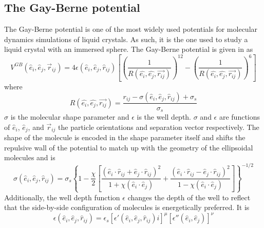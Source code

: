 \documentclass[preprint, aps]{revtex4-1}
\begin{document}
\subsection*{The Gay-Berne potential}
The Gay-Berne potential is one of the most widely used potentials for molecular 
dynamics simulations of liquid crystals. As such, it is the one used to study a
liquid crystal with an immersed sphere. The Gay-Berne potential is given in
\cite{luckhurst06} as
	\begin{equation} \label{gay-berne}
		V^{GB}(\hat{e}_i,\hat{e}_j,\vec{r}_{ij})
			= 4\epsilon (\hat{e}_i,\hat{e}_j,\hat{r}_{ij}) 
			\left[
				\left(\frac{1}{R(\hat{e_i},\hat{e_j},\vec{r_{ij}})}\right)^{12}
				- 
				\left(\frac{1}{R(\hat{e_i},\hat{e_j},\vec{r_{ij}})}\right)^{6}
			\right]
	\end{equation}
where
	\begin{equation} \label{distance-term}
		R(\hat{e_i},\hat{e_j},\vec{r_{ij}}) = \frac{
			r_{ij} - \sigma(\hat{e}_i,\hat{e}_j,\hat{r}_{ij})
			+ \sigma_s
		}
		{
			\sigma_s
		}
	\end{equation}
$\sigma$ is the molecular shape parameter and $\epsilon$ is the well depth. 
$\sigma$ and $\epsilon$ are functions of $\hat{e}_i$, $\hat{e}_j$, and 
$\vec{r}_{ij}$ the particle orientations and separation vector respectively. 
The shape of the molecule is encoded in the shape parameter itself and shifts 
the repulsive wall of the potential to match up with the geometry of the
ellipsoidal molecules and is
	\begin{equation} \label{distance-function}
		\sigma(\hat{e}_i,\hat{e}_j,\hat{r}_{ij})
		= \sigma_s \left\{
			1 
			- \frac{\chi}{2} \left[
				\frac{
					(\hat{e}_i \cdot \hat{r}_{ij} 
					+ \hat{e}_j \cdot \hat{r}_{ij})^2
				}
				{
					1 + \chi(\hat{e}_i \cdot \hat{e}_j)
				}
				+\frac{
					(\hat{e}_i \cdot \hat{r}_{ij} 
					- \hat{e}_j \cdot \hat{r}_{ij})^2
				}
				{
					1 - \chi(\hat{e}_i \cdot \hat{e}_j)
				}
		\right]\right\}^{-1/2}
	\end{equation}
Additionally, the well depth function $\epsilon$ changes the depth of the well 
to reflect that the side-by-side configuration of molecules is energetically 
preferred. It is 
	\begin{equation} \label{orientation-function}
		\epsilon(\hat{e}_i,\hat{e}_j,\hat{r}_{ij}) 
		= \epsilon_s
			\left[	
				\epsilon'(\hat{e}_i,\hat{e}_j,\hat{r}_{ij})i
			\right]^\mu
			\left[
				\epsilon''(\hat{e}_i,\hat{e}_j)
			\right]^\nu
	\end{equation}
\end{document}
